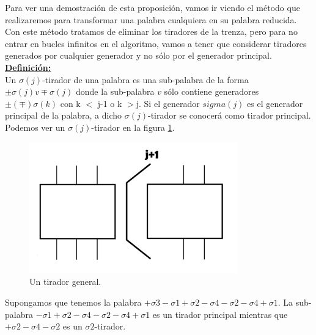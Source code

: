 \documentclass[14pt]{extarticle}
\begin{document}
Para ver una demostración de esta proposición, vamos ir viendo el método que realizaremos para transformar una palabra cualquiera en su palabra reducida.\\ 
Con este método tratamos de eliminar los tiradores de la trenza, pero para no entrar en bucles infinitos en el algoritmo, vamos a tener que considerar tiradores generados por cualquier generador y no sólo por el generador principal.\\

\underline{\textbf{Definición:}}\\
 Un $ \sigma(j) $-tirador de una palabra es una sub-palabra de la forma $ \pm \sigma(j) v \mp \sigma(j) $ donde la sub-palabra $v$ sólo contiene generadores $ \pm (\mp) \sigma(k) $ con k $<$ j-1 o k $>$j. Si el generador $sigma(j)$ es el generador principal de la palabra, a dicho $ \sigma(j) $-tirador se conocerá como tirador principal.\\
 
 Podemos ver un $ \sigma(j) $-tirador en la figura \ref{h2}.\\
 \begin{figure}[h!]
 	\centering
 	\includegraphics[width=9cm]{itrenzas/h12.png}
 	\caption{Un tirador general.}
 	\label{h2} 
 \end{figure}
 
 Supongamos que tenemos la palabra $ +\sigma3-\sigma1+\sigma2-\sigma4-\sigma2-\sigma4+\sigma1 $. La sub-palabra $ -\sigma1+\sigma2-\sigma4-\sigma2-\sigma4+\sigma1  $ es un tirador principal mientras que $ +\sigma2-\sigma4-\sigma2 $ es un $ \sigma2 $-tirador.\\
 
\end{document}
